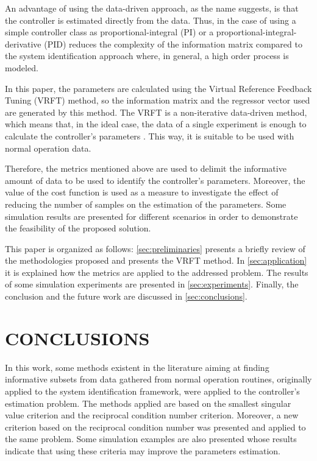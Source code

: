 \documentclass[letterpaper, 10 pt, conference]{ieeeconf}  %
\begin{document}
An advantage of using the data-driven approach, as the name suggests, is that the controller is estimated directly from the data.
Thus, in the case of using a simple controller class as proportional-integral (PI) or a proportional-integral-derivative (PID) reduces the complexity of the information matrix compared to the system identification approach where, in general, a high order process is modeled.



In this paper, the parameters are calculated using the Virtual Reference Feedback Tuning (VRFT) method, so the information matrix and the regressor vector used are generated by this method.
The VRFT is a non-iterative data-driven method, which means that, in the ideal case, the data of a single experiment is enough to calculate the controller's parameters \cite{bazanella2011data}.
This way, it is suitable to be used with normal operation data.

Therefore, the metrics mentioned above are used to delimit the informative amount of data to be used to identify the controller's parameters.
Moreover, the value of the cost function is used as a measure to investigate the effect of reducing the number of samples on the estimation of the parameters.
Some simulation results are presented for different scenarios in order to demonstrate the feasibility of the proposed solution.

This paper is organized as follows: \autoref{sec:preliminaries} presents a briefly review of the methodologies proposed and presents the VRFT method.
In \autoref{sec:application} it is explained how the metrics are applied to the addressed problem.
The results of some simulation experiments are presented in \autoref{sec:experiments}.
Finally, the conclusion and the future work are discussed in \autoref{sec:conclusions}.








\section{\label{sec:conclusions} CONCLUSIONS}

In this work, some methods existent in the literature aiming at finding informative subsets from data gathered from normal operation routines, originally applied to the system identification framework, were applied to the controller's estimation problem.
The methods applied are based on the smallest singular value criterion and the reciprocal condition number criterion.
Moreover, a new criterion based on the reciprocal condition number was presented and applied to the same problem.
Some simulation examples are also presented whose results indicate that using these criteria may improve the parameters estimation.
\end{document}
